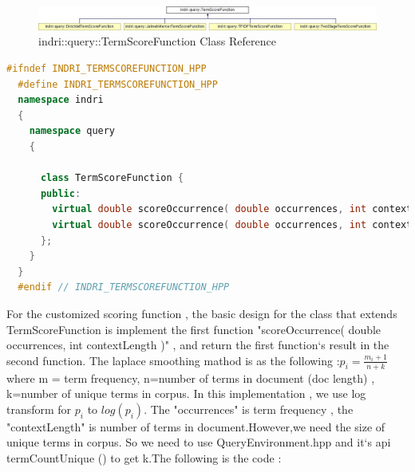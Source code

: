 \documentclass{article}
\def\m_space{\vspace{8pt}}
\begin{document}
\begin{figure}[H]
  \begin{center}
  \includegraphics[width=1.0\textwidth]{image/indri_class.jpg}
  \caption{indri::query::TermScoreFunction Class Reference \cite{ref5}}
  \label{fig:env_07}
  \end{center}
\end{figure}

\newpage
\begin{lstlisting}[language=c++,caption={TermScoreFunction.hpp},basicstyle=\tiny]
  #ifndef INDRI_TERMSCOREFUNCTION_HPP
  #define INDRI_TERMSCOREFUNCTION_HPP
  namespace indri
  {
    namespace query
    {
      
      class TermScoreFunction {
      public:
        virtual double scoreOccurrence( double occurrences, int contextLength ) = 0;
        virtual double scoreOccurrence( double occurrences, int contextLength, double documentOccurrences, int documentLength ) = 0;
      };
    }
  }
  #endif // INDRI_TERMSCOREFUNCTION_HPP
\end{lstlisting}
\m_space
  For the customized scoring function , the basic design for the class that extends TermScoreFunction 
is implement the first function "scoreOccurrence( double occurrences, int contextLength )" , and return the first function`s result in the second function.
The laplace smoothing mathod is as the following :$p_i = \frac{m_i+1}{n+k}$where m = term frequency, n=number of terms in document (doc length) , k=number of unique terms in corpus.
In this implementation , we use log transform for $p_i$ to $log\left(p_i\right)$.
The "occurrences" is term frequency , the "contextLength" is number of terms in document.However,we need the size of unique terms in corpus.
So we need to use QueryEnvironment.hpp and it`s api termCountUnique () to get k.The following is the code :
\end{document}
